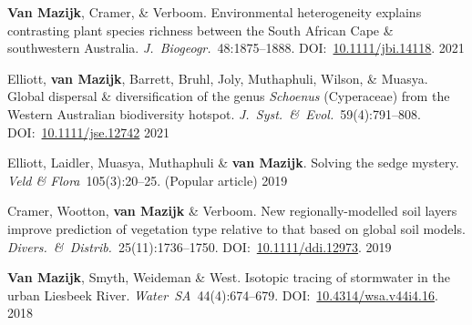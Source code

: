 \begin{hangparas}{2em}{1}

\textbf{Van Mazijk}, Cramer, \& Verboom.
Environmental heterogeneity explains contrasting plant species richness between
the South African Cape \& southwestern Australia.
\textit{J.~Biogeogr.}~48:1875--1888.
DOI:~\href{https://doi.org/10.1111/jbi.14118}{10.1111/jbi.14118}. \hfill 2021

Elliott, \textbf{van Mazijk}, Barrett, Bruhl,
Joly, Muthaphuli, Wilson, \& Muasya.
Global dispersal \& diversification of the genus \textit{Schoenus} (Cyperaceae)
from the Western Australian biodiversity hotspot.
\textit{J.~Syst.~\&~Evol.}~59(4):791--808.
DOI:~\href{https://doi.org/10.1111/jse.1274}{10.1111/jse.12742} \hfill 2021

Elliott, Laidler, Muasya, Muthaphuli \& \textbf{van Mazijk}.
Solving the sedge mystery.
\textit{Veld \& Flora}~105(3):20--25.
(Popular article) \hfill 2019

Cramer, Wootton, \textbf{van Mazijk} \& Verboom.
New regionally-modelled soil layers improve prediction of vegetation type
relative to that based on global soil models.
\textit{Divers.~\&~Distrib.}~25(11):1736--1750.
DOI:~\href{https://doi.org/10.1111/ddi.12973}{10.1111/ddi.12973}. \hfill 2019

\textbf{Van Mazijk}, Smyth, Weideman \& West.
Isotopic tracing of stormwater in the urban Liesbeek River.
\textit{Water~SA}~44(4):674--679.
DOI:~\href{https://doi.org/10.4314/wsa.v44i4.16}{10.4314/wsa.v44i4.16}. \hfill 2018

\end{hangparas}
